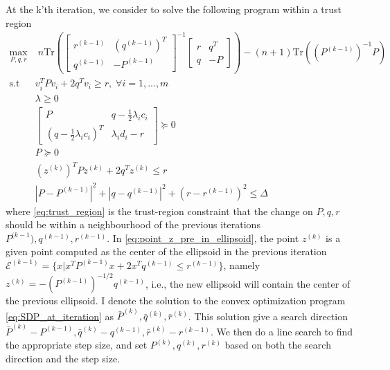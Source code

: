 \documentclass{article}
\begin{document}
At the k'th iteration, we consider to solve the following program within a trust region
\begin{subequations}
\begin{align}
	\max_{P, q, r}&\;n\text{Tr}\left(\begin{bmatrix}r^{(k-1)} &(q^{(k-1)})^T\\q^{(k-1)} & -P^{(k-1)}\end{bmatrix}^{-1}\begin{bmatrix} r & q^T\\q & -P\end{bmatrix}\right) - (n+1)\text{Tr}\left((P^{(k-1)})^{-1} P\right)\\
	\text{s.t }& v_i^TPv_i + 2q^Tv_i\ge r,\;\forall i=1,..., m\\
		   &\lambda \ge 0\\
		   &\begin{bmatrix}
		P  & q-\frac{1}{2}\lambda_i c_i\\
		(q-\frac{1}{2}\lambda_i c_i)^T & \lambda_id_i-r
		\end{bmatrix}\succeq 0\\
		   &P\succeq 0\\
		   &\left(z^{(k)}\right)^TPz^{(k)} + 2q^Tz^{(k)}\le r\label{eq:point_z_pre_in_ellipsoid}\\
		   &|P - P^{(k-1)}|^2 + |q - q^{(k-1)}|^2 + (r-r^{(k-1)})^2\le \Delta \label{eq:trust_region}
\end{align}
\label{eq:SDP_at_iteration}
\end{subequations}
where \eqref{eq:trust_region} is the trust-region constraint that the change on $P, q, r$ should be within a neighbourhood of the previous iterations $P^{(k-1}), q^{(k-1)}, r^{(k-1)}$. In \eqref{eq:point_z_pre_in_ellipsoid}, the point $z^{(k)}$ is a given point computed as the center of the ellipsoid in the previous iteration $\mathcal{E}^{(k-1)} = \{x | x^TP^{(k-1)}x + 2x^Tq^{(k-1)}\le r^{(k-1)}\}$, namely $z^{(k)} = -\left(P^{(k-1)}\right)^{-1/2}q^{(k-1)}$, i.e., the new ellipsoid will contain the center of the previous ellipsoid. I denote the solution to the convex optimization program \eqref{eq:SDP_at_iteration} as $\bar{P}^{(k)}, \bar{q}^{(k)}, \bar{r}^{(k)}$. This solution give a search direction $\bar{P}^{(k)} - P^{(k-1)}, \bar{q}^{(k)}-q^{(k-1)}, \bar{r}^{(k)}-r^{(k-1)}$. We then do a line search to find the appropriate step size, and set $P^{(k)}, q^{(k)}, r^{(k)}$ based on both the search direction and the step size.
\end{document}
